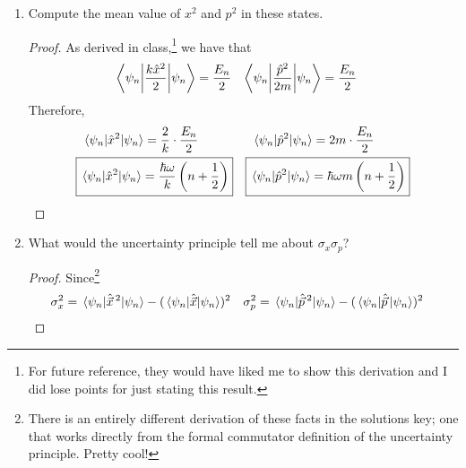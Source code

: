 \documentclass[../psets.tex]{subfiles}
\begin{document}
\begin{enumerate}
\begin{enumerate}
\begin{proof}
\begin{align*}
                \Aboxed{\ev{\hat{\vec{x}}}{\psi_n} &= 0}
            \end{align*}
            and
            \begin{align*}
                \ev{\hat{\vec{p}}\,}{\psi_n} &= i\sqrt{\frac{\hbar m\omega}{2}}\left[ \ev{a_+}{\psi_n}-\ev{a_-}{\psi_n} \right]\\
                &= i\sqrt{\frac{\hbar m\omega}{2}}\big[ \sqrt{n+1}\underbrace{\braket{\psi_n}{\psi_{n+1}}}_0-\sqrt{n}\underbrace{\braket{\psi_n}{\psi_{n-1}}}_0 \big]\\
                \Aboxed{\ev{\hat{\vec{p}}\,}{\psi_n} &= 0}
            \end{align*}
        \end{proof}
        \item Compute the mean value of $x^2$ and $p^2$ in these states.
        \begin{proof}
            As derived in class,\footnote{For future reference, they would have liked me to show this derivation and I did lose points for just stating this result.} we have that
            \begin{align*}
                \ev**{\frac{k\hat{x}^2}{2}}{\psi_n} &= \frac{E_n}{2}&
                \ev**{\frac{\hat{p}^2}{2m}}{\psi_n} &= \frac{E_n}{2}
            \end{align*}
            Therefore,
            \begin{align*}
                \ev{\hat{x}^2}{\psi_n} &= \frac{2}{k}\cdot\frac{E_n}{2}&
                    \ev{\hat{p}^2}{\psi_n} &= 2m\cdot\frac{E_n}{2}\\
                \Aboxed{\ev{\hat{x}^2}{\psi_n} &= \frac{\hbar\omega}{k}\left( n+\frac{1}{2} \right)}&
                    \Aboxed{\ev{\hat{p}^2}{\psi_n} &= \hbar\omega m\left( n+\frac{1}{2} \right)}
            \end{align*}
        \end{proof}
        \item What would the uncertainty principle tell me about $\sigma_x\sigma_p$?
        \begin{proof}
            Since\footnote{There is an entirely different derivation of these facts in the solutions key; one that works directly from the formal commutator definition of the uncertainty principle. Pretty cool!}
            \begin{align*}
                \sigma_x^2 &= \ev{\hat{\vec{x}}{\,}^2}{\psi_n}-(\ev{\hat{\vec{x}}}{\psi_n})^2&
                \sigma_p^2 &= \ev{\hat{\vec{p}}{\,}^2}{\psi_n}-(\ev{\hat{\vec{p}}\,}{\psi_n})^2

\end{align*}
\end{proof}
\end{enumerate}
\end{enumerate}
\end{document}
